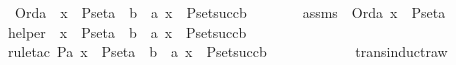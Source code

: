 \begin{isabellebody}
\ \ {\isachardoublequoteopen}Ord{\isacharparenleft}{\kern0pt}a{\isacharparenright}{\kern0pt}\ {\isasymLongrightarrow}\ x\ {\isasymin}\ P{\isacharunderscore}{\kern0pt}set{\isacharparenleft}{\kern0pt}a{\isacharparenright}{\kern0pt}\ {\isasymLongrightarrow}\ {\isacharparenleft}{\kern0pt}{\isasymexists}b\ {\isacharless}{\kern0pt}\ a{\isachardot}{\kern0pt}\ x\ {\isasymin}\ P{\isacharunderscore}{\kern0pt}set{\isacharparenleft}{\kern0pt}succ{\isacharparenleft}{\kern0pt}b{\isacharparenright}{\kern0pt}{\isacharparenright}{\kern0pt}{\isacharparenright}{\kern0pt}{\isachardoublequoteclose}\ \isanewline
%
\isadelimproof
%
\endisadelimproof
%
\isatagproof
{}\isamarkupfalse%
\ {\isacharminus}{\kern0pt}\ \isanewline
\ \ \isamarkupfalse%
\ assms\ {\isacharcolon}{\kern0pt}\ {\isachardoublequoteopen}Ord{\isacharparenleft}{\kern0pt}a{\isacharparenright}{\kern0pt}{\isachardoublequoteclose}\ {\isachardoublequoteopen}x\ {\isasymin}\ P{\isacharunderscore}{\kern0pt}set{\isacharparenleft}{\kern0pt}a{\isacharparenright}{\kern0pt}{\isachardoublequoteclose}\isanewline
\ \ \isamarkupfalse%
\ \isamarkupfalse%
\ helper\ {\isacharcolon}{\kern0pt}\ {\isachardoublequoteopen}x\ {\isasymin}\ P{\isacharunderscore}{\kern0pt}set{\isacharparenleft}{\kern0pt}a{\isacharparenright}{\kern0pt}\ {\isasymlongrightarrow}\ {\isacharparenleft}{\kern0pt}{\isasymexists}b\ {\isacharless}{\kern0pt}\ a{\isachardot}{\kern0pt}\ x\ {\isasymin}\ P{\isacharunderscore}{\kern0pt}set{\isacharparenleft}{\kern0pt}succ{\isacharparenleft}{\kern0pt}b{\isacharparenright}{\kern0pt}{\isacharparenright}{\kern0pt}{\isacharparenright}{\kern0pt}{\isachardoublequoteclose}\ \ \isanewline
\ \ \ \ \isamarkupfalse%
\ {\isacharparenleft}{\kern0pt}rule{\isacharunderscore}{\kern0pt}tac\ P{\isacharequal}{\kern0pt}{\isachardoublequoteopen}{\isasymlambda}a{\isachardot}{\kern0pt}\ x\ {\isasymin}\ P{\isacharunderscore}{\kern0pt}set{\isacharparenleft}{\kern0pt}a{\isacharparenright}{\kern0pt}\ {\isasymlongrightarrow}\ {\isacharparenleft}{\kern0pt}{\isasymexists}b\ {\isacharless}{\kern0pt}\ a{\isachardot}{\kern0pt}\ x\ {\isasymin}\ P{\isacharunderscore}{\kern0pt}set{\isacharparenleft}{\kern0pt}succ{\isacharparenleft}{\kern0pt}b{\isacharparenright}{\kern0pt}{\isacharparenright}{\kern0pt}{\isacharparenright}{\kern0pt}{\isachardoublequoteclose}\ \isanewline
\ \ \ \ \ \ \ \ \ \ \ trans{\isacharunderscore}{\kern0pt}induct{}{\isacharunderscore}{\kern0pt}raw{\isacharparenright}{\kern0pt}\isanewline
\ \ \ \ \isamarkupfalse%

\end{isabellebody}
